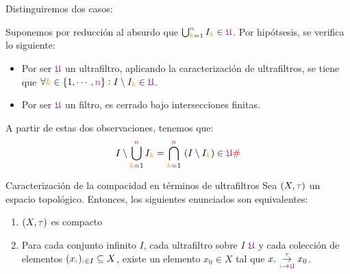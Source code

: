 \documentclass[titlepage,11pt,a4paper]{book}
\newcommand{\ultf}{\ensuremath{\textcolor{Plum}{\mathfrak{U}}}}
\newcommand{\ii}{\ensuremath{\textcolor{TealBlue}{i}}}
\newcommand{\nn}{\ensuremath{\textcolor{Plum}{n}}}
\newcommand{\taut}{\textcolor{Fuchsia}{\tau}}
\newcommand{\kk}{\textcolor{orange}{k}}
\begin{document}
    \begin{dem}
    Distinguiremos dos casos:
    
    \medskip

     Suponemos por reducción al absurdo que $\bigcup_{\kk=1}^{\nn} I_{\kk} \in \ultf$. Por hipótsesis, se verifica lo siguiente:
     \begin{itemize}
        \item[(a)] Por ser $\ultf$ un ultrafiltro, aplicando la caracterización de ultrafiltros, se tiene que $\forall \kk \in \{1, \cdots, \nn\} : I \setminus I_{\kk} \in \ultf$.
        \item[(b)] Por ser $\ultf$ un filtro, es cerrado bajo intersecciones finitas.
     \end{itemize}

     \smallskip
     A partir de estas dos observaciones, tenemos que:
     \[
     \begin{aligned}
        I \setminus \bigcup_{\kk=1}^{\nn} I_{\kk} = \bigcap_{\kk=1}^{\nn} \ (I \setminus I_{\kk})  \in \ultf \textcolor{red}{\#}
     \end{aligned}
     \]
    \end{dem}

    \begin{thm*}{Caracterización de la compacidad en términos de ultrafiltros}
        Sea $(X, \taut)$ un espacio topológico. Entonces, los siguientes enunciados son equivalentes:
        \begin{enumerate}
            \item[(1)] $(X, \taut)$ es compacto
            \item[(2)] Para cada conjunto infinito $I$, cada ultrafiltro sobre $I$ $\ultf$ y cada colección de elementos $(x_{\ii})_{\ii \in I} \subseteq X$, existe un elemento $x_{0} \in X$ tal que $x_{\ii} \underset{\ii \to \ultf}{\overset{\taut}{\to}} x_{0}$.
        \end{enumerate}
    \end{thm*}
\end{document}
